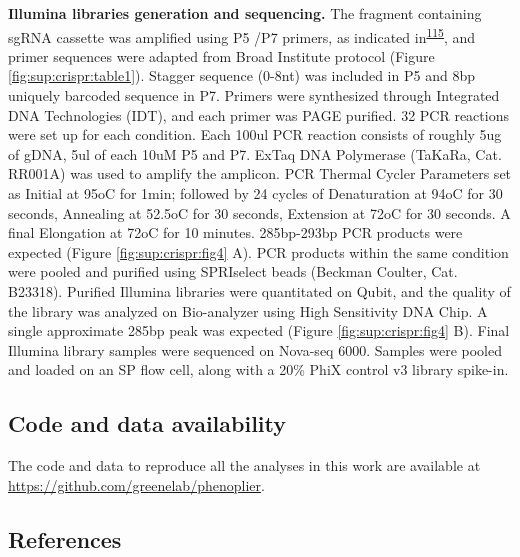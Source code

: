 \documentclass[
  a4paper,
]{article}
\begin{document}
\textbf{Illumina libraries generation and sequencing.}
The fragment containing sgRNA cassette was amplified using P5 /P7 primers, as indicated in\textsuperscript{\protect\hyperlink{ref-vNXTnmxp}{115}}, and primer sequences were adapted from Broad Institute protocol (Figure \ref{fig:sup:crispr:table1}).
Stagger sequence (0-8nt) was included in P5 and 8bp uniquely barcoded sequence in P7.
Primers were synthesized through Integrated DNA Technologies (IDT), and each primer was PAGE purified.
32 PCR reactions were set up for each condition.
Each 100ul PCR reaction consists of roughly 5ug of gDNA, 5ul of each 10uM P5 and P7.
ExTaq DNA Polymerase (TaKaRa, Cat. RR001A) was used to amplify the amplicon.
PCR Thermal Cycler Parameters set as Initial at 95oC for 1min; followed by 24 cycles of Denaturation at 94oC for 30 seconds, Annealing at 52.5oC for 30 seconds, Extension at 72oC for 30 seconds.
A final Elongation at 72oC for 10 minutes.
285bp-293bp PCR products were expected (Figure \ref{fig:sup:crispr:fig4} A).
PCR products within the same condition were pooled and purified using SPRIselect beads (Beckman Coulter, Cat. B23318).
Purified Illumina libraries were quantitated on Qubit, and the quality of the library was analyzed on Bio-analyzer using High Sensitivity DNA Chip.
A single approximate 285bp peak was expected (Figure \ref{fig:sup:crispr:fig4} B).
Final Illumina library samples were sequenced on Nova-seq 6000.
Samples were pooled and loaded on an SP flow cell, along with a 20\% PhiX control v3 library spike-in.

\hypertarget{code-and-data-availability}{%
\subsection{Code and data availability}\label{code-and-data-availability}}

The code and data to reproduce all the analyses in this work are available at \url{https://github.com/greenelab/phenoplier}.

\hypertarget{references}{%
\subsection{References}\label{references}}
\end{document}
